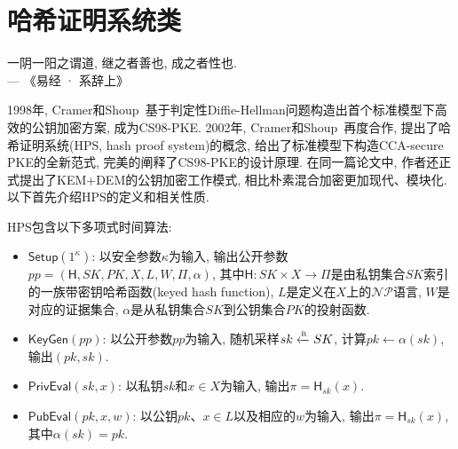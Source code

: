 \section{哈希证明系统类}
\begin{center}
	一阴一阳之谓道, 继之者善也, 成之者性也.\\
                \hfill --- 《易经 · 系辞上》
\end{center}

1998年, Cramer和Shoup~\cite{CS-CRYPTO-1998}基于判定性Diffie-Hellman问题构造出首个标准模型下高效的公钥加密方案, 成为CS98-PKE. 
2002年, Cramer和Shoup~\cite{CS-EUROCRYPT-2002}再度合作, 提出了哈希证明系统(HPS, hash proof system)的概念, 
给出了标准模型下构造CCA-secure PKE的全新范式, 完美的阐释了CS98-PKE的设计原理. 
在同一篇论文中, 作者还正式提出了KEM+DEM的公钥加密工作模式, 相比朴素混合加密更加现代、模块化. 
以下首先介绍HPS的定义和相关性质. 


\begin{definition}[哈希证明系统]
HPS包含以下多项式时间算法: 
\begin{itemize}
\item $\mathsf{Setup}(1^\kappa)$: 以安全参数$\kappa$为输入, 输出公开参数$pp = (\mathsf{H}, SK, PK, X, L, W, \Pi, \alpha)$, 
    其中$\mathsf{H}: SK \times X \rightarrow \Pi$是由私钥集合$SK$索引的一族带密钥哈希函数(keyed hash function), 
    $L$是定义在$X$上的$\mathcal{NP}$语言, $W$是对应的证据集合, $\alpha$是从私钥集合$SK$到公钥集合$PK$的投射函数. 

\item $\mathsf{KeyGen}(pp)$: 以公开参数$pp$为输入, 随机采样$sk \xleftarrow{\textup{\tiny R}} SK$, 计算$pk \leftarrow \alpha(sk)$, 输出$(pk, sk)$. 

\item $\mathsf{PrivEval}(sk, x)$: 以私钥$sk$和$x \in X$为输入, 输出$\pi = \mathsf{H}_{sk}(x)$. 

\item $\mathsf{PubEval}(pk, x, w)$: 以公钥$pk$、$x \in L$以及相应的$w$为输入, 输出$\pi = \mathsf{H}_{sk}(x)$, 其中$\alpha(sk) = pk$. 
\end{itemize}
\end{definition}

